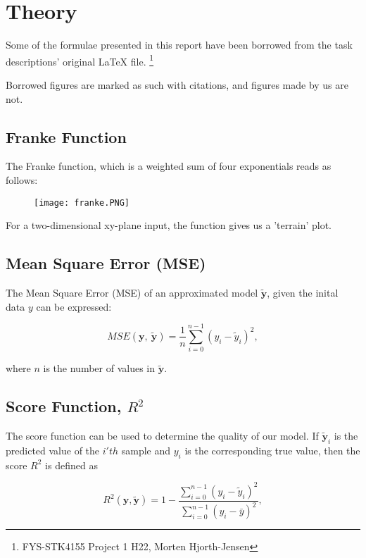 \documentclass[reprint,english,notitlepage]{revtex4-1}  %
\begin{document}
\section{Theory}

Some of the formulae presented in this report have been borrowed from the task descriptions' original LaTeX file. \hfill \footnote{FYS-STK4155 Project 1 H22, Morten Hjorth-Jensen}

Borrowed figures are marked as such with citations, and figures made by us are not.

\subsection{Franke Function}

The Franke function, which is a weighted sum of four exponentials reads as
follows:

\begin{figure}[h!]
    \centering
    \texttt{[image: franke.PNG]}
\end{figure}

For a two-dimensional xy-plane input, the function gives us a 'terrain' plot.

\subsection{Mean Square Error (MSE)}



The Mean Square Error (MSE) of an approximated model $\tilde{\bm{y}}$, given the inital data ${y}$ can be expressed:

\[ MSE(\bm{y}, \ \tilde{\bm{y}}) = \frac{1}{n}
\sum_{i=0}^{n-1}(y_i-\tilde{y}_i)^2, 
\] 

where $n$ is the number of values in $\tilde{\bm{y}}$.\\

\subsection{Score Function, $R^2$}

The score function can be used to determine the quality of our model. If $\tilde{\bm{y}}_i$ is the predicted value of the $i'th$ sample and $y_i$ is the corresponding true value, then the score $R^2$ is defined as

\[
R^2(\bm{y}, \tilde{\bm{y}}) = 1 - \frac{\sum_{i=0}^{n - 1} (y_i - \tilde{y}_i)^2}{\sum_{i=0}^{n - 1} (y_i - \bar{y})^2},
\]
\end{document}
